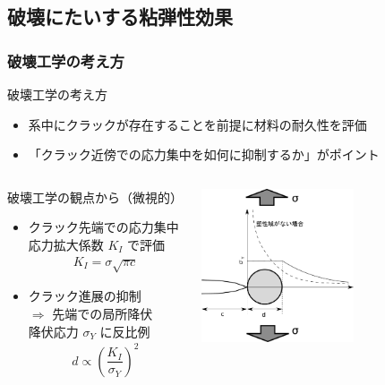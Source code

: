 \documentclass[11pt, dvipdfmx]{beamer}
\begin{document}
\subsection{破壊にたいする粘弾性効果}

\begin{frame}
\frametitle{破壊工学の考え方}
\begin{exampleblock}{破壊工学の考え方}

\begin{itemize}
\item
系中にクラックが存在することを前提に材料の耐久性を評価
\item
\alert{「クラック近傍での応力集中を如何に抑制するか」}がポイント
\end{itemize}
\end{exampleblock}

\begin{columns}[totalwidth=1\textwidth]
\begin{alertblock}{破壊工学の観点から（微視的）}
	\begin{itemize}
		\item
		クラック先端での応力集中\\ \alert{応力拡大係数 $K_I$ で評価}
		\footnotesize
		\begin{align*}
		K_{I} = \sigma \sqrt{\pi c}
		\end{align*}
		\normalsize
		\item 
		クラック進展の抑制 \\
		$\Rightarrow$ 先端での\alert{局所降伏}\\
		降伏応力 $\sigma_Y$ に反比例
		\footnotesize
		\begin{align*}
		d \propto \left( \dfrac{K_I}{\sigma_Y} \right)^2
		\end{align*}
		\normalsize
	\end{itemize}
\end{alertblock}
	\centering
	\includegraphics[width=45mm]{./fig/Crack_Yield.pdf}
\end{columns}

\end{frame}
\end{document}
